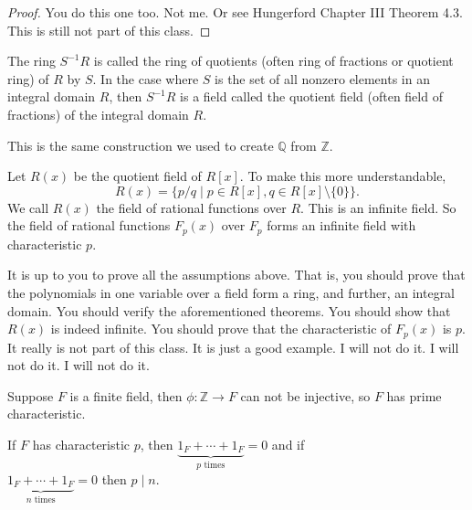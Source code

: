 \begin{eg}
\begin{theorem}[{[Hungerford]}]
\begin{itemize}
		\end{itemize}
	\end{theorem}
	\begin{proof}
		You do this one too. Not me. Or see Hungerford Chapter III Theorem 4.3. This is still not part of this class.
	\end{proof}
	\begin{definition}
		The ring \(S^{-1} R\) is called the ring of quotients (often ring of fractions or quotient ring) of \(R\) by \(S\). In the case where \(S\) is the set of all nonzero elements in an integral domain \(R\), then \(S^{-1} R\) is a field called the quotient field (often field of fractions) of the integral domain \(R\).
		\begin{remark}
			This is the same construction we used to create \(\mathbb{Q} \) from \(\mathbb{Z} \).
		\end{remark}
	\end{definition}
	Let \(R(x)\) be the quotient field of \(R[x]\). To make this more understandable,
	\[
		R(x) = \{ p/q \mid p \in R[x], q \in R[x]\setminus \{ 0 \}  \}.
	\]
	We call \(R(x)\) the field of rational functions over \(R\). This is an infinite field. So the field of rational functions \(F_p(x)\) over \(F_p\) forms an infinite field with characteristic \(p\).   
\end{eg}
\begin{explanation}
	It is up to you to prove all the assumptions above. That is, you should prove that the polynomials in one variable over a field form a ring, and further, an integral domain. You should verify the aforementioned theorems. You should show that \(R(x)\) is indeed infinite. You should prove that the characteristic of \(F_p(x)\) is \(p\). It really is not part of this class. It is just a good example. I will not do it. I will not do it. I will not do it.
\end{explanation}
\begin{lemma}
	Suppose \(F\) is a finite field, then \(\phi \colon \mathbb{Z} \to F\) can not be injective, so \(F\) has prime characteristic.
\end{lemma}
\begin{lemma}
	If \(F\) has characteristic \(p\), then \(\underbrace{1_F + \cdots + 1_F}_{p \text{ times} } = 0\) and if \\ \(\underbrace{1_F + \cdots + 1_F}_{n \text{ times} } = 0\) then \(p\mid n\).
\end{lemma}

